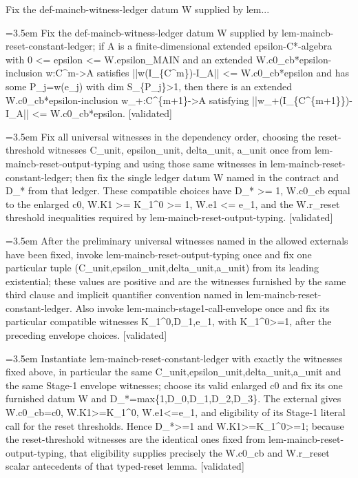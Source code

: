 \documentclass{article}
\newcommand{\step}[1]{\par\noindent\hangindent=3.5em\hangafter=1%
  \makebox[3.5em][l]{\textbf{#1.}}}
\newcommand{\steptag}[1]{\hfill{\small\textsf{[#1]}}}
\begin{document}
\begin{proofbox}{Fix the def-maincb-witness-ledger datum W supplied by lem...}
\step{1} Fix the def-maincb-witness-ledger datum W supplied by lem-maincb-reset-constant-ledger; if A is a finite-dimensional extended epsilon-C*-algebra with 0 <= epsilon <= W.epsilon\_MAIN and an extended W.c0\_cb*epsilon-inclusion w:C\textasciicircum{}m->A satisfies ||w(I\_\{C\textasciicircum{}m\})-I\_A|| <= W.c0\_cb*epsilon and has some P\_j=w(e\_j) with dim S\_\{P\_j\}>1, then there is an extended W.c0\_cb*epsilon-inclusion w\_+:C\textasciicircum{}\{m+1\}->A satisfying ||w\_+(I\_\{C\textasciicircum{}\{m+1\}\})-I\_A|| <= W.c0\_cb*epsilon. \steptag{validated} \\[6pt]
\step{1.1} Fix all universal witnesses in the dependency order, choosing the reset-threshold witnesses C\_unit, epsilon\_unit, delta\_unit, a\_unit once from lem-maincb-reset-output-typing and using those same witnesses in lem-maincb-reset-constant-ledger; then fix the single ledger datum W named in the contract and D\_* from that ledger. These compatible choices have D\_* >= 1, W.c0\_cb equal to the enlarged c0, W.K1 >= K\_1\textasciicircum{}0 >= 1, W.e1 <= e\_1, and the W.r\_reset threshold inequalities required by lem-maincb-reset-output-typing. \steptag{validated} \\[6pt]
\step{1.1.1} After the preliminary universal witnesses named in the allowed externals have been fixed, invoke lem-maincb-reset-output-typing once and fix one particular tuple (C\_unit,epsilon\_unit,delta\_unit,a\_unit) from its leading existential; these values are positive and are the witnesses furnished by the same third clause and implicit quantifier convention named in lem-maincb-reset-constant-ledger. Also invoke lem-maincb-stage1-call-envelope once and fix its particular compatible witnesses K\_1\textasciicircum{}0,D\_1,e\_1, with K\_1\textasciicircum{}0>=1, after the preceding envelope choices. \steptag{validated} \\[4pt]
\step{1.1.2} Instantiate lem-maincb-reset-constant-ledger with exactly the witnesses fixed above, in particular the same C\_unit,epsilon\_unit,delta\_unit,a\_unit and the same Stage-1 envelope witnesses; choose its valid enlarged c0 and fix its one furnished datum W and D\_*=max\{1,D\_0,D\_1,D\_2,D\_3\}. The external gives W.c0\_cb=c0, W.K1>=K\_1\textasciicircum{}0, W.e1<=e\_1, and eligibility of its Stage-1 literal call for the reset thresholds. Hence D\_*>=1 and W.K1>=K\_1\textasciicircum{}0>=1; because the reset-threshold witnesses are the identical ones fixed from lem-maincb-reset-output-typing, that eligibility supplies precisely the W.c0\_cb and W.r\_reset scalar antecedents of that typed-reset lemma. \steptag{validated} \\[6pt]

\end{proofbox}
\end{document}
